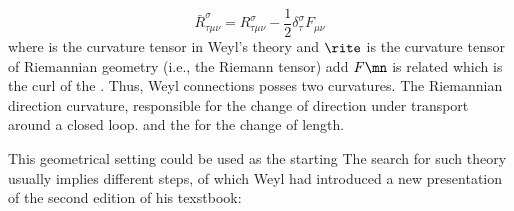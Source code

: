 {$$\bar{R}_{\tau \mu \nu}^{\sigma}=R_{\tau \mu \nu}^{\sigma}-\frac{1}{2} \delta_{\tau}^{\sigma} F_{\mu \nu}$$
%
where \rite is the curvature tensor in Weyl's theory and $\rite$ is the curvature tensor of Riemannian geometry (i.e., the Riemann tensor) add $F\mn$ is related which is the curl of the \phin. Thus, Weyl connections posses two curvatures. The Riemannian direction curvature, responsible for the change of direction under transport around a closed loop. and the  for the change of length. 








This geometrical setting could be used as the starting  The search for such theory usually implies different steps, of which Weyl had introduced a new presentation of the second edition of his texstbook:

}
